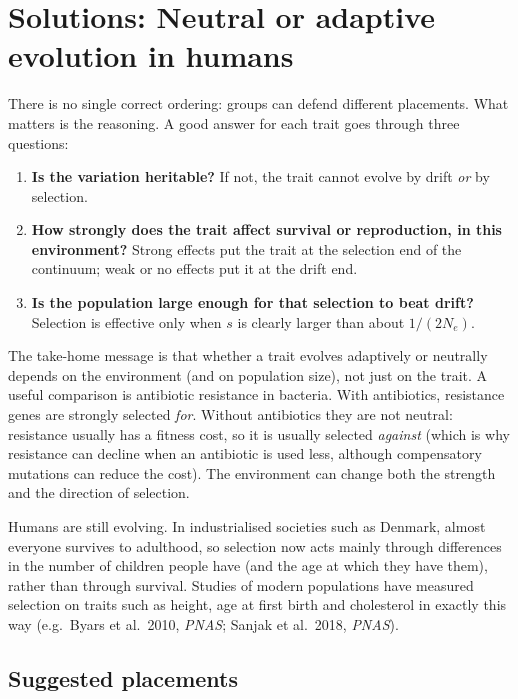 \documentclass[
  a4paper]{book}
\providecommand{\tightlist}{%
  \setlength{\itemsep}{0pt}\setlength{\parskip}{0pt}}
\begin{document}
\section{Solutions: Neutral or adaptive evolution in humans}\label{solutions-neutral-or-adaptive-evolution-in-humans}

There is no single correct ordering: groups can defend different placements. What matters is the reasoning. A good answer for each trait goes through three questions:

\begin{enumerate}
\def\labelenumi{\arabic{enumi}.}
\tightlist
\item
  \textbf{Is the variation heritable?} If not, the trait cannot evolve by drift \emph{or} by selection.
\item
  \textbf{How strongly does the trait affect survival or reproduction, in this environment?} Strong effects put the trait at the selection end of the continuum; weak or no effects put it at the drift end.
\item
  \textbf{Is the population large enough for that selection to beat drift?} Selection is effective only when \(s\) is clearly larger than about \(1/(2N_e)\).
\end{enumerate}

The take-home message is that whether a trait evolves adaptively or neutrally depends on the environment (and on population size), not just on the trait. A useful comparison is antibiotic resistance in bacteria. With antibiotics, resistance genes are strongly selected \emph{for}. Without antibiotics they are not neutral: resistance usually has a fitness cost, so it is usually selected \emph{against} (which is why resistance can decline when an antibiotic is used less, although compensatory mutations can reduce the cost). The environment can change both the strength and the direction of selection.

Humans are still evolving. In industrialised societies such as Denmark, almost everyone survives to adulthood, so selection now acts mainly through differences in the number of children people have (and the age at which they have them), rather than through survival. Studies of modern populations have measured selection on traits such as height, age at first birth and cholesterol in exactly this way (e.g.~Byars et al.~2010, \emph{PNAS}; Sanjak et al.~2018, \emph{PNAS}).

\subsection{Suggested placements}\label{suggested-placements}
\end{document}
